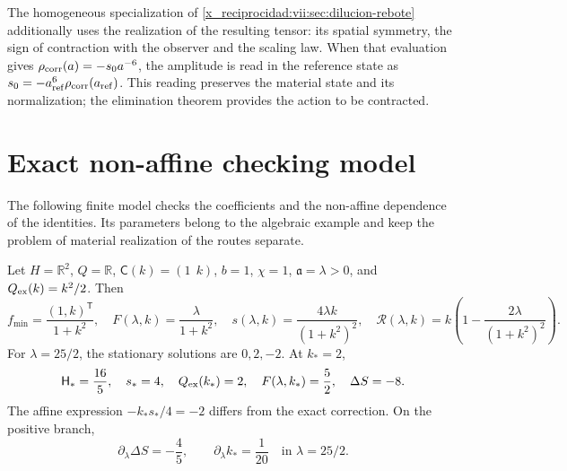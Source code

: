 The homogeneous specialization of
\ref{x_reciprocidad:vii:sec:dilucion-rebote} additionally uses the realization of the
resulting tensor: its spatial symmetry, the sign of contraction
with the observer and the scaling law. When that evaluation gives
\(\rho_{\rm corr}(a)=-s_0a^{-6}\), the amplitude is read in the
reference state as
\(s_0=-a_{\rm ref}^{6}\rho_{\rm corr}(a_{\rm ref})\).
This reading preserves the material state and its normalization; the
elimination theorem provides the action to be contracted.

\section{Exact non-affine checking model}
\label{x_reciprocidad:vii:subsec:control-no-afin}

The following finite model checks the coefficients and the
non-affine dependence of the identities. Its parameters belong
to the algebraic example and keep the problem of material
realization of the routes separate.

\begin{proposition}
\label{x_reciprocidad:vii:prop:ejemplo-no-afin}
Let \(H=\mathbb R^2\), \(Q=\mathbb R\),
\(\mathsf C(k)=(1\ \ k)\), \(b=1\), \(\chi=1\),
\(\mathfrak a=\lambda>0\), and \(Q_{\rm ex}(k)=k^2/2\).
Then
\begin{equation}
 f_{\min}=\frac{(1,k)^{\mathsf T}}{1+k^2},\quad
 F(\lambda,k)=\frac{\lambda}{1+k^2},\quad
 s(\lambda,k)=\frac{4\lambda k}{(1+k^2)^2},\quad
 \mathcal R(\lambda,k)
    =k\left(1-\frac{2\lambda}{(1+k^2)^2}\right).
 \label{x_reciprocidad:vii:eq:ejemplo-minimo-no-afin}
\end{equation}
For \(\lambda=25/2\), the stationary solutions are
\(0,2,-2\). At \(k_*=2\),
\begin{equation}
 \mathsf H_*=\frac{16}{5},\quad s_*=4,\quad
 Q_{\rm ex}(k_*)=2,\quad F(\lambda,k_*)=\frac52,
 \quad \Delta S=-8.
 \label{x_reciprocidad:vii:eq:valores-ejemplo-no-afin}
\end{equation}
The affine expression \(-k_*s_*/4=-2\) differs from the exact
correction. On the positive branch,
\begin{equation}
 \partial_\lambda\Delta S=-\frac45,
 \qquad \partial_\lambda k_* =\frac1{20}
 \quad\text{in }\lambda=25/2.
 \label{x_reciprocidad:vii:eq:derivadas-ejemplo-no-afin}
\end{equation}
\end{proposition}

